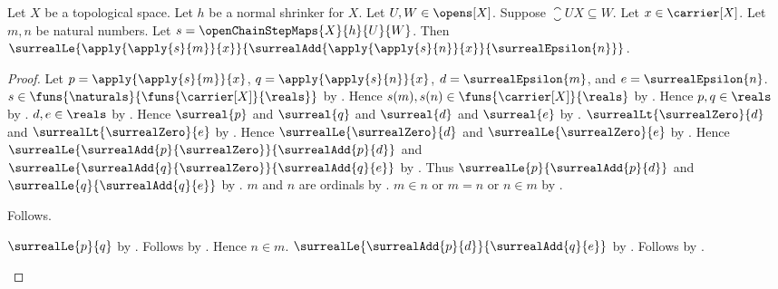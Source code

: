 \begin{theorem}\label{open_chain_step_map_below_envelope}
    Let $X$ be a topological space.
    Let $h$ be a normal shrinker for $X$.
    Let $U,W\in\opens[X]$.
    Suppose $\closure{U}{X}\subseteq W$.
    Let $x\in\carrier[X]$.
    Let $m,n$ be natural numbers.
    Let $s=\openChainStepMaps{X}{h}{U}{W}$.
    Then
        $\surrealLe{\apply{\apply{s}{m}}{x}}
            {\surrealAdd{\apply{\apply{s}{n}}{x}}
                {\surrealEpsilon{n}}}$.
\end{theorem}
\begin{proof}
    Let $p=\apply{\apply{s}{m}}{x}$, $q=\apply{\apply{s}{n}}{x}$,
        $d=\surrealEpsilon{m}$, and $e=\surrealEpsilon{n}$.
    $s\in\funs{\naturals}{\funs{\carrier[X]}{\reals}}$
        by .
    Hence $s(m),s(n)\in\funs{\carrier[X]}{\reals}$
        by .
    Hence $p,q\in\reals$ by .
    $d,e\in\reals$ by .
    Hence $\surreal{p}$ and $\surreal{q}$ and $\surreal{d}$ and
        $\surreal{e}$ by .
    $\surrealLt{\surrealZero}{d}$ and
        $\surrealLt{\surrealZero}{e}$
        by .
    Hence $\surrealLe{\surrealZero}{d}$ and
        $\surrealLe{\surrealZero}{e}$ by .
    Hence
        $\surrealLe{\surrealAdd{p}{\surrealZero}}
            {\surrealAdd{p}{d}}$ and
        $\surrealLe{\surrealAdd{q}{\surrealZero}}
            {\surrealAdd{q}{e}}$
        by .
    Thus $\surrealLe{p}{\surrealAdd{p}{d}}$ and
        $\surrealLe{q}{\surrealAdd{q}{e}}$
        by .
    $m$ and $n$ are ordinals by .
    $m\in n$ or $m=n$ or $n\in m$
        by .
    \begin{byCase}
        Follows.
        \begin{byCase}
            $\surrealLe{p}{q}$
                by .
            Follows by
                .
            Hence $n\in m$.
            $\surrealLe{\surrealAdd{p}{d}}{\surrealAdd{q}{e}}$
                by .
            Follows by
                .
        \end{byCase}
    \end{byCase}
\end{proof}

